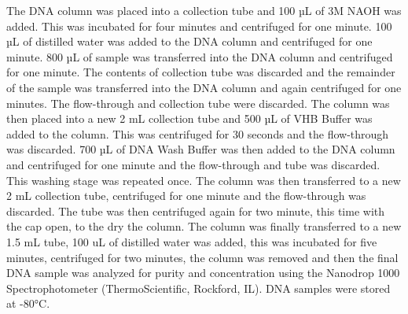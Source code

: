 The DNA column was placed into a collection tube and 100 µL of 3M NAOH was added. This was incubated for four minutes and centrifuged for one minute. 100 µL of distilled water was added to the DNA column and centrifuged for one minute. 800 µL of sample was transferred into the DNA column and centrifuged for one minute. The contents of collection tube was discarded and the remainder of the sample was transferred into the DNA column and again centrifuged for one minutes. The flow-through and collection tube were discarded. The column was then placed into a new 2 mL collection tube and 500 µL of VHB Buffer was added to the column. This was centrifuged for 30 seconds and the flow-through was discarded. 700 µL of DNA Wash Buffer was then added to the DNA column and centrifuged for one minute and the flow-through and tube was discarded. This washing stage was repeated once. The column was then transferred to a new 2 mL collection tube, centrifuged for one minute and the flow-through was discarded. The tube was then centrifuged again for two minute, this time with the cap open, to the dry the column. The column was finally transferred to a new 1.5 mL tube, 100 uL of distilled water was added, this was incubated for five minutes, centrifuged for two minutes, the column was removed and then the final DNA sample was analyzed for purity and concentration using the Nanodrop 1000 Spectrophotometer (ThermoScientific, Rockford, IL). DNA samples were stored at -80°C.
